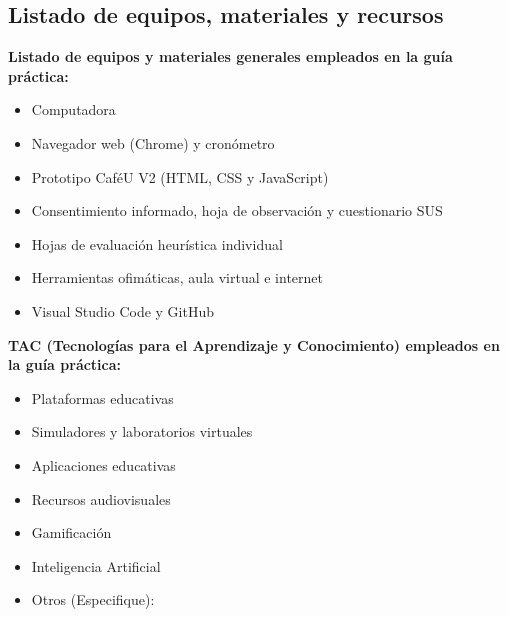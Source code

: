 \documentclass{article}
\begin{document}
\subsection{Listado de equipos, materiales y recursos}
\textbf{Listado de equipos y materiales generales empleados en la guía práctica:}
\begin{itemize}[leftmargin=1.5em, itemsep=3pt]
    \item Computadora
    \item Navegador web (Chrome) y cronómetro
    \item Prototipo CaféU V2 (HTML, CSS y JavaScript)
    \item Consentimiento informado, hoja de observación y cuestionario SUS
    \item Hojas de evaluación heurística individual
    \item Herramientas ofimáticas, aula virtual e internet
    \item Visual Studio Code y GitHub
\end{itemize}

\textbf{TAC (Tecnologías para el Aprendizaje y Conocimiento) empleados en la guía práctica:}
\begin{itemize}[leftmargin=1.5em, itemsep=2pt]
    \item[$\square$] Plataformas educativas
    \item[$\square$] Simuladores y laboratorios virtuales
    \item[$\square$] Aplicaciones educativas
    \item[$\square$] Recursos audiovisuales
    \item[$\square$] Gamificación
    \item[$\blacksquare$] Inteligencia Artificial
    \item Otros (Especifique): \underline{\hspace{5cm}}
\end{itemize}
\end{document}
